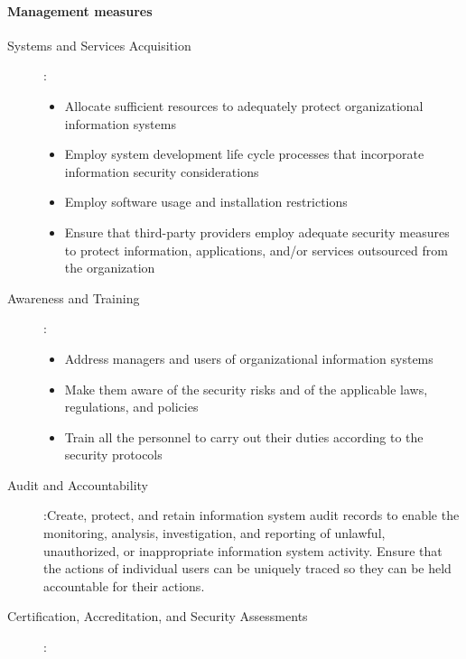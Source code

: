 \documentclass{article}
\begin{document}
                \paragraph{Management measures}
                        \begin{description}
                            \item[Systems and Services Acquisition]:
                            \begin{itemize}
                                \item Allocate sufficient resources to adequately protect organizational information systems
                                \item Employ system development life cycle processes that incorporate information security considerations
                                \item Employ software usage and installation restrictions
                                \item Ensure that third-party providers employ adequate security measures to protect information, applications, and/or services outsourced from the organization
                            \end{itemize}
                            \item[Awareness and Training]: 
                            \begin{itemize}
                                \item Address managers and users of organizational information systems
                                \item Make them aware of the security risks and of the applicable laws, regulations, and policies
                                \item Train all the personnel to carry out their duties according to the security protocols
                            \end{itemize}
                            \item[Audit and Accountability]:Create, protect, and retain information system audit records to enable the monitoring, analysis, investigation, and reporting of unlawful, unauthorized, or inappropriate information system activity. Ensure that the actions of individual users can be uniquely traced so they can be held accountable for their actions.
                            \item[Certification, Accreditation, and Security Assessments]:
                            \begin{itemize}

\end{itemize}
\end{description}
\end{document}
